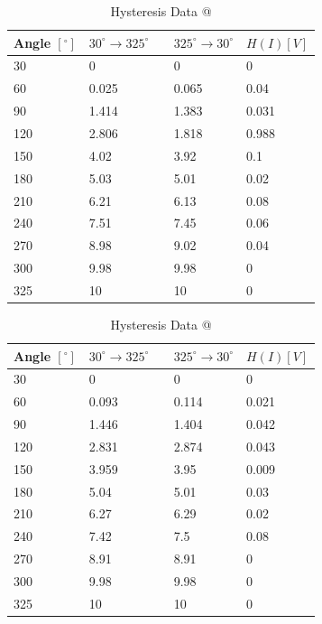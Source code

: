 \documentclass[a4,11pt]{article}
\makeatletter
\newcommand*{\rom}[1]{\expandafter\@slowromancap\romannumeral #1@}
\makeatother
\begin{document}
\begin{table}[H]
	\centering
	\caption{Hysteresis Data \rom{2}}
	\label{hyst2}
	\begin{tabular}{l|l|l||l}
		Angle $[^{\circ}]$  &  $30^{\circ}\rightarrow325^{\circ}$  \
		&  $325^{\circ}\rightarrow30^{\circ}$  &  $H(I) [V]$  \\
		\hline
		30  &  0  &  0  &  0  \\
		60  &  0.025  &  0.065  &  0.04  \\
		90  &  1.414   &  1.383  &  0.031  \\
		120  &  2.806  &  1.818  &  0.988  \\
		150  &  4.02  &  3.92  &  0.1  \\
		180  &  5.03  &  5.01  &  0.02  \\
		210  &  6.21  &  6.13  &  0.08  \\
		240  &  7.51  &  7.45  &  0.06  \\
		270  &  8.98  &  9.02  &  0.04  \\
		300  &  9.98  &  9.98  &  0  \\
		325  &  10  &  10  &  0  \\
	\end{tabular}
\end{table}

\begin{table}[H]
	\centering
	\caption{Hysteresis Data \rom{3}}
	\label{hyst3}
	\begin{tabular}{l|l|l||l}
		Angle $[^{\circ}]$  &  $30^{\circ}\rightarrow325^{\circ}$  \
		&  $325^{\circ}\rightarrow30^{\circ}$  &  $H(I) [V]$  \\
		\hline
		30  &  0  &  0  &  0  \\
		60  &  0.093  &  0.114  &  0.021  \\
		90  &  1.446  &  1.404  &  0.042  \\
		120  &  2.831  &  2.874  &  0.043  \\
		150  &  3.959  &  3.95  &  0.009  \\
		180  &  5.04  &  5.01  &  0.03  \\
		210  &  6.27  &  6.29  &  0.02  \\
		240  &  7.42  &  7.5  &  0.08  \\
		270  &  8.91  &  8.91  &  0  \\
		300  &  9.98  &  9.98  &  0  \\
		325  &  10  &  10  &  0  \\
	\end{tabular}
\end{table}
\end{document}
